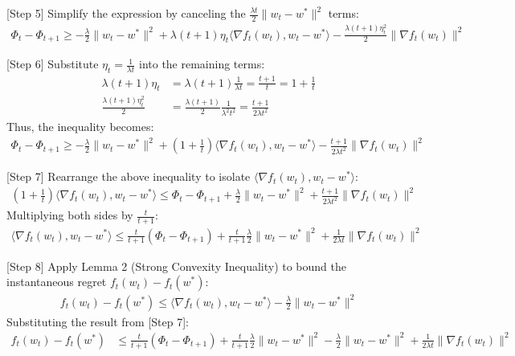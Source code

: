 \documentclass{article}
\begin{document}
[Step 5] Simplify the expression by canceling the $\frac{\lambda t}{2} \|w_t - w^*\|^2$ terms:
\begin{align*}
\Phi_t - \Phi_{t+1} \geq - \frac{\lambda}{2} \|w_t - w^*\|^2 + \lambda(t+1)\eta_t \langle \nabla f_t(w_t), w_t - w^* \rangle - \frac{\lambda(t+1)\eta_t^2}{2} \|\nabla f_t(w_t)\|^2
\end{align*}

[Step 6] Substitute $\eta_t = \frac{1}{\lambda t}$ into the remaining terms:
\begin{align*}
\lambda(t+1)\eta_t &= \lambda(t+1) \frac{1}{\lambda t} = \frac{t+1}{t} = 1 + \frac{1}{t} \\
\frac{\lambda(t+1)\eta_t^2}{2} &= \frac{\lambda(t+1)}{2} \frac{1}{\lambda^2 t^2} = \frac{t+1}{2\lambda t^2}
\end{align*}
Thus, the inequality becomes:
\begin{align*}
\Phi_t - \Phi_{t+1} \geq - \frac{\lambda}{2} \|w_t - w^*\|^2 + \left(1 + \frac{1}{t}\right) \langle \nabla f_t(w_t), w_t - w^* \rangle - \frac{t+1}{2\lambda t^2} \|\nabla f_t(w_t)\|^2
\end{align*}

[Step 7] Rearrange the above inequality to isolate $\langle \nabla f_t(w_t), w_t - w^* \rangle$:
\begin{align*}
\left(1 + \frac{1}{t}\right) \langle \nabla f_t(w_t), w_t - w^* \rangle \leq \Phi_t - \Phi_{t+1} + \frac{\lambda}{2} \|w_t - w^*\|^2 + \frac{t+1}{2\lambda t^2} \|\nabla f_t(w_t)\|^2
\end{align*}
Multiplying both sides by $\frac{t}{t+1}$:
\begin{align*}
\langle \nabla f_t(w_t), w_t - w^* \rangle \leq \frac{t}{t+1} \left( \Phi_t - \Phi_{t+1} \right) + \frac{t}{t+1} \frac{\lambda}{2} \|w_t - w^*\|^2 + \frac{1}{2\lambda t} \|\nabla f_t(w_t)\|^2
\end{align*}

[Step 8] Apply Lemma 2 (Strong Convexity Inequality) to bound the instantaneous regret $f_t(w_t) - f_t(w^*)$:
\begin{align*}
f_t(w_t) - f_t(w^*) \leq \langle \nabla f_t(w_t), w_t - w^* \rangle - \frac{\lambda}{2} \|w_t - w^*\|^2
\end{align*}
Substituting the result from [Step 7]:
\begin{align*}
f_t(w_t) - f_t(w^*) &\leq \frac{t}{t+1} \left( \Phi_t - \Phi_{t+1} \right) + \frac{t}{t+1} \frac{\lambda}{2} \|w_t - w^*\|^2 - \frac{\lambda}{2} \|w_t - w^*\|^2 + \frac{1}{2\lambda t} \|\nabla f_t(w_t)\|^2
\end{align*}
\end{document}
